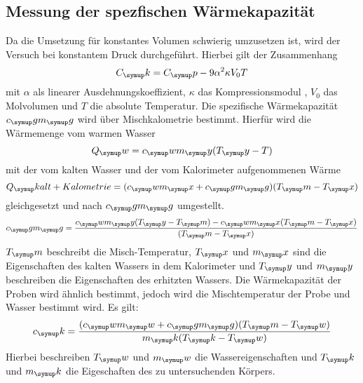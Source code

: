 \subsection{Messung der spezfischen Wärmekapazität}
Da die Umsetzung für konstantes Volumen schwierig umzusetzen ist, wird der
Versuch bei konstantem Druck durchgeführt. Hierbei gilt der Zusammenhang
\begin{equation}
  C_\su{k} = C_\su{p}-9\alpha^2\kappa V_0T
  \label{eq:mol}
\end{equation}
mit $\alpha$ als linearer Ausdehnungskoeffizient, $\kappa$ das Kompressionsmodul
, $V_0$ das Molvolumen und $T$ die absolute Temperatur. Die spezifische
Wärmekapazität $c_\su{g}m_\su{g}$ wird über Mischkalometrie bestimmt.
Hierfür wird die Wärmemenge vom warmen Wasser
\begin{equation}
  Q_\su{w}=c_\su{w}m_\su{y}(T_\su{y}-T)
\end{equation}
mit der vom kalten Wasser und der vom Kalorimeter aufgenommenen Wärme
\begin{equation}
  Q_\su{kalt+Kalometrie}=(c_\su{w}m_\su{x}+c_\su{g}m_\su{g})(T_\su{m}-T_\su{x})
\end{equation}
gleichgesetzt und nach $c_\su{g}m_\su{g}$ umgestellt.
\begin{equation}
  c_\su{g}m_\su{g}=\frac{c_\su{w}m_\su{y}(T_\su{y}-T_\su{m})-c_\su{w}m_\su{x}
  (T_\su{m}-T_\su{x})}{(T_\su{m}-T_\su{x})}
  \label{eq:kalo}
\end{equation}
$T_\su{m}$ beschreibt die Misch-Temperatur, $T_\su{x}$ und $m_\su{x}$ sind die
Eigenschaften des kalten Wassers in dem Kalorimeter und $T_\su{y}$ und $m_\su{y}$
beschreiben die Eigenschaften des erhitzten Wassers.
Die Wärmekapazität der Proben wird ähnlich bestimmt, jedoch wird die
Mischtemperatur der Probe und Wasser bestimmt wird. Es gilt:
\begin{equation}
  c_\su{k}=\frac{(c_\su{w}m_\su{w}+c_\su{g}m_\su{g})(T_\su{m}-T_\su{w})}
  {m_\su{k}(T_\su{k}-T_\su{w})}
  \label{eq:probe}
\end{equation}
Hierbei beschreiben $T_\su{w}$ und $m_\su{w}$ die Wassereigenschaften und $T_\su{k}$
und $m_\su{k}$ die Eigeschaften des zu untersuchenden Körpers.
